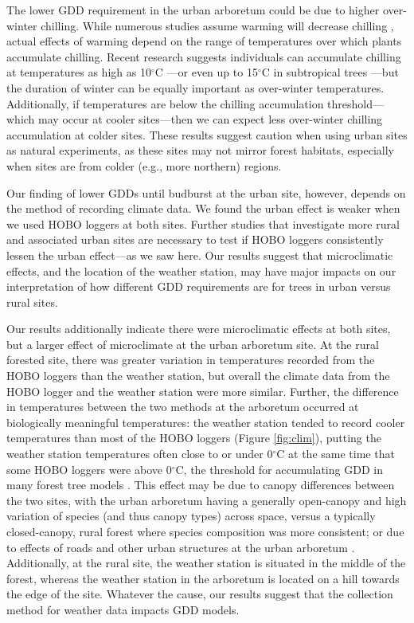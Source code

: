 \documentclass{article}\usepackage[]{graphicx}\usepackage[]{color}
\begin{document}
The lower GDD requirement in the urban arboretum could be due to higher over-winter chilling. While numerous studies assume warming will decrease chilling \citep{Luedeling2011,Fu2015,Asse2018}, actual effects of warming depend on the range of temperatures over which plants accumulate chilling. Recent research suggests individuals can accumulate chilling at temperatures as high as 10$^{\circ}$C \citep{Baumgarten2021}---or even up to 15$^{\circ}$C in subtropical trees \citep{Zhang2021}---but the duration of winter can be equally important as over-winter temperatures. Additionally, if temperatures are below the chilling accumulation threshold---which may occur at cooler sites---then we can expect less over-winter chilling accumulation at colder sites. These results suggest caution when using urban sites as natural experiments, as these sites may not mirror forest habitats, especially when sites are from colder (e.g., more northern) regions. 

Our finding of lower GDDs until budburst at the urban site, however, depends on the method of recording climate data. We found the urban effect is weaker when we used HOBO loggers at both sites. Further studies that investigate more rural and associated urban sites are necessary to test if HOBO loggers consistently lessen the urban effect---as we saw here. Our results suggest that microclimatic effects, and the location of the weather station, may have major impacts on our interpretation of how different GDD requirements are for trees in urban versus rural sites. 

Our results additionally indicate there were microclimatic effects at both sites, but a larger effect of microclimate at the urban arboretum site. At the rural forested site, there was greater variation in temperatures recorded from the HOBO loggers than the weather station, but overall the climate data from the HOBO logger and the weather station were more similar. Further, the difference in temperatures between the two methods at the arboretum occurred at biologically meaningful temperatures: the weather station tended to record cooler temperatures than most of the HOBO loggers (Figure \ref{fig:clim}), putting the weather station temperatures often close to or under 0$^{\circ}$C at the same time that some HOBO loggers were above 0$^{\circ}$C, the threshold for accumulating GDD in many forest tree models \citep{Man2010}. This effect may be due to canopy differences between the two sites, with the urban arboretum having a generally open-canopy and high variation of species (and thus canopy types) across space, versus a typically closed-canopy, rural forest where species composition was more consistent; or due to effects of roads and other urban structures at the urban arboretum \citep{Stabler2005,Erell2012,Dimoudi2013}. Additionally, at the rural site, the weather station is situated in the middle of the forest, whereas the weather station in the arboretum is located on a hill towards the edge of the site. Whatever the cause, our results suggest that the collection method for weather data impacts GDD models.
\end{document}
